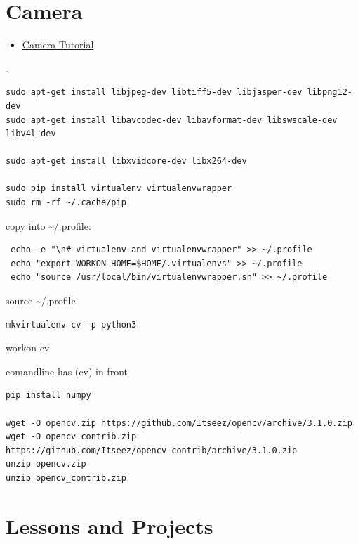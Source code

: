 \section{Camera}\label{camera}

\begin{itemize}

\item
  \href{https://www.raspberrypi.org/learning/getting-started-with-picamera/worksheet/}{Camera
  Tutorial}
\end{itemize}

.

\begin{verbatim}
sudo apt-get install libjpeg-dev libtiff5-dev libjasper-dev libpng12-dev
sudo apt-get install libavcodec-dev libavformat-dev libswscale-dev libv4l-dev

sudo apt-get install libxvidcore-dev libx264-dev

sudo pip install virtualenv virtualenvwrapper
sudo rm -rf ~/.cache/pip
\end{verbatim}

copy into \textasciitilde{}/.profile:

\begin{verbatim}
 echo -e "\n# virtualenv and virtualenvwrapper" >> ~/.profile
 echo "export WORKON_HOME=$HOME/.virtualenvs" >> ~/.profile
 echo "source /usr/local/bin/virtualenvwrapper.sh" >> ~/.profile
\end{verbatim}

source \textasciitilde{}/.profile

\begin{verbatim}
mkvirtualenv cv -p python3
\end{verbatim}

workon cv

comandline has (cv) in front

\begin{verbatim}
pip install numpy

wget -O opencv.zip https://github.com/Itseez/opencv/archive/3.1.0.zip
wget -O opencv_contrib.zip https://github.com/Itseez/opencv_contrib/archive/3.1.0.zip
unzip opencv.zip
unzip opencv_contrib.zip
\end{verbatim}

\section{Lessons and Projects}\label{lessons-and-projects}

